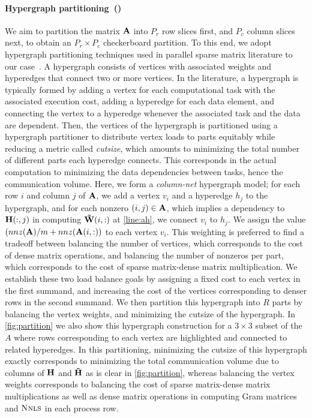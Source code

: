 \paragraph{Hypergraph partitioning~(\cpp)} We aim to partition the matrix $\mathbf{A}$ into $P_r$ row slices first, and $P_c$ column slices next, to obtain an $P_r \times P_c$ checkerboard partition.
To this end, we adopt hypergraph partitioning techniques used in parallel sparse matrix literature to our case~\cite{caay:99}.
A hypergraph consists of vertices with associated weights and hyperedges that connect two or more vertices.
In the literature, a hypergraph is typically formed by adding a vertex for each computational task with the associated execution cost, adding a hyperedge for each data element, and connecting the vertex to a hyperedge whenever the associated task and the data are dependent.
Then, the vertices of the hypergraph is partitioned using a hypergraph partitioner to distribute vertex loads to parts equitably while reducing a metric called \emph{cutsize}, which amounts to minimizing the total number of different parts each hyperedge connects.
This corresponds in the actual computation to minimizing the data dependencies between tasks, hence the communication volume.
Here, we form a \emph{column-net} hypergraph model; for each row $i$ and column $j$ of  $\mathbf{A}$, we add a vertex $v_i$ and a hyperedge $h_j$ to the hypergraph, and for each nonzero $(i, j) \in \mathbf{A}$, which implies a dependency to $\mathbf{H}(:, j)$ in computing $\mathbf{\tilde{W}}(i, :)$ at \cref{line:ah}, we connect $v_i$ to $h_j$.
We assign the value $(nnz(\mathbf{A}) / m + nnz(\mathbf{A}(i, :))$ to each vertex $v_i$.
This weighting is preferred to find a tradeoff between balancing the number of vertices, which corresponds to the cost of dense matrix operations, and balancing the number of nonzeros per part, which corresponds to the cost of sparse matrix-dense matrix multiplication.
We establish these two load balance goals by assigning a fixed cost to each vertex in the first summand, and increasing the cost of the vertices corresponding to denser rows in the second summand.
We then partition this hypergraph into $R$ parts by balancing the vertex weights, and minimizing the cutsize of the hypergraph.
In \cref{fig:partition} we also show this hypergraph construction for a $3 \times 3$ subset of the $A$ where rows corresponding to each vertex are highlighted and connected to related hyperedges.
In this partitioning, minimizing the cutsize of this hypergraph exactly corresponds to minimizing the total communication volume due to columns of $\mathbf{H}$ and $\mathbf{\tilde{H}}$ as is clear in \cref{fig:partition}, whereas balancing the vertex weights corresponds to balancing the cost of sparse matrix-dense matrix multiplications as well as dense matrix operations in computing Gram matrices and $\textsc{Nnls}$ in each process row.

